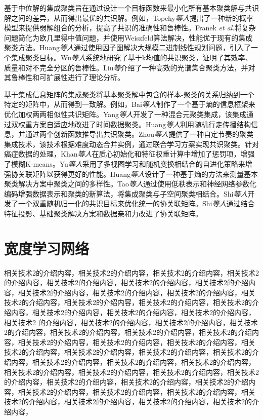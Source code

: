 \documentclass[unicode,pdfcover]{hquthesis}
\begin{document}
基于中位解的集成聚类旨在通过设计一个目标函数来最小化所有基本聚类解与共识解之间的差异，从而得出最优的共识解。例如，Topchy\textit{等人}\cite{Topchy2005Clustering}提出了一种新的概率模型来提供弱解组合的分析，提高了共识的准确性和鲁棒性。Franek \textit{et al.}\cite{Franek2014Ensemble}将复杂问题简化为欧几里得中值问题，并使用Weiszfeld算法解决，性能优于现有的集成聚类方法。Huang\textit{等人}\cite{Huang2016Ensemble}通过使用因子图解决大规模二进制线性规划问题，引入了一个集成聚类目标。Wu\textit{等人}\cite{Wu2013theoretic}\cite{Wu2015Means}系统地研究了基于k均值的共识聚类，证明了其效率、质量和对不完全分区的鲁棒性。Liu\textit{等}\cite{Liu2017Spectral}介绍了一种高效的光谱集合聚类方法，并对其鲁棒性和可扩展性进行了理论分析。

基于集成信息矩阵的集成聚类将基本聚类解中包含的样本-聚类的关系归纳到一个特定的矩阵中，从而得到一致解。例如，Bai\textit{等人}\cite{Bai2019Information}制作了一个基于熵的信息框架来优化加权两两相似性共识矩阵。Yang\textit{等人}\cite{Yang2019Adaptive}开发了一种混合元聚类集成，该集成通过双权重方案自适应地改进了时间数据聚类。Huang\textit{等人}\cite{Huang2021Enhanced}利用随机行走传播结构信息，并通过两个创新函数推导出共识聚类。Zhou\textit{等人}\cite{Zhou2021Self}提供了一种自定节奏的聚类集成技术，该技术根据难度动态合并实例，通过联合学习方案实现共识聚类。针对癌症数据的处理，Khan\textit{等人}\cite{Khan2021Ensemble}在质心初始化和特征权重计算中增加了惩罚项，增强了模糊K-means。Yu\textit{等人}\cite{Yu2022Clustering}采用了多视图学习和随机变换相结合的自进化策略来增强协关联矩阵以获得更好的性能。Huang\textit{等人}\cite{Huang2022Toward}设计了一种基于熵的方法来测量基本聚类解决方案中聚类之间的多样性。Tao\textit{等人}\cite{Tao2023From}通过使用低秩表示和神经网络参数化编码增强数据表示和聚类的新算法，将集成聚类与子空间聚类相结合。Shi\textit{等人}\cite{Shi2023Adaptive}开发了一个双重随机归一化的共识目标来优化统一的协关联矩阵。Shi\textit{等人}\cite{Shi2024Consensus}通过结合特征投影、基础聚类解决方案和数据亲和力改进了协关联矩阵。


\section{宽度学习网络}

相关技术2的介绍内容，相关技术2的介绍内容，相关技术2的介绍内容，相关技术2的介绍内容，相关技术2的介绍内容，相关技术2的介绍内容，相关技术2的介绍内容，相关技术2的介绍内容，相关技术2的介绍内容，相关技术2的介绍内容，相关技术2的介绍内容，相关技术2的介绍内容，相关技术2的介绍内容，相关技术2的介绍内容，相关技术2的介绍内容，相关技术2的介绍内容，相关技术2的介绍内容，相关技术2 的介绍内容，相关技术2的介绍内容，相关技术2的介绍内容，相关技术2的介绍内容，相关技术2的介绍内容，相关技术2的介绍内容，相关技术2的介绍内容，相关技术2的介绍内容，相关技术2的介绍内容，相关技术2的介绍内容，相关技术2的介绍内容，相关技术2的介绍内容，相关技术2的介绍内容，相关技术2的介绍内容，相关技术2的介绍内容，相关技术2的介绍内容，相关技术2的介绍内容，相关技术2的介绍内容，相关技术2的介绍内容，相关技术2的介绍内容，相关技术2的介绍内容，相关技术2的介绍内容，相关技术2的介绍内容，相关技术2的介绍内容，相关技术2的介绍内容，相关技术2的介绍内容，相关技术2的介绍内容，相关技术2的介绍内容，相关技术2的介绍内容，相关技术2的介绍内容，相关技术2的介绍内容，
\end{document}
